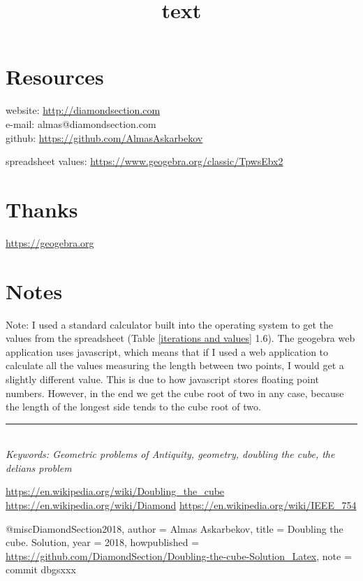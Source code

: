 \documentclass[12pt, letterpaper, oneside]{report}
\begin{document}
\begin{minipage}{0.8\textwidth}

\title{text}

	
\section{Resources}


website: \url{ http://diamondsection.com} \\
e-mail: almas@diamondsection.com \\
github: \url{https://github.com/AlmasAskarbekov}

spreadsheet values: \url{https://www.geogebra.org/classic/TpwsEbx2}

\section{Thanks}
\url{https://geogebra.org}
\\
\section{Notes}
Note: I used a standard calculator built into the operating system to get the values from the spreadsheet (Table \ref{iterations and values} 1.6). The geogebra web application uses javascript, which means that if I used a web application to calculate all the values measuring the length between two points, I would get a slightly different value. This is due to how javascript stores floating point numbers\cite{C}.  However, in the end we get the cube root of two in any case, because the length of the longest side tends to the cube root of two.
\end{minipage}
\vspace{365pt}
\hrule
\ 
\\
\emph{Keywords: Geometric problems of Antiquity, geometry, doubling the cube, the delians problem}




\begin{thebibliography}{5}
\url{https://en.wikipedia.org/wiki/Doubling_the_cube}
\url{https://en.wikipedia.org/wiki/Diamond}
\url{https://en.wikipedia.org/wiki/IEEE_754}
\end{thebibliography}

\vspace{465pt}
@misc{DiamondSection2018,
	author = {Almas Askarbekov},
	title = {Doubling the cube. Solution},
	year = {2018},
	howpublished = {\url{https://github.com/DiamondSection/Doubling-the-cube-Solution_Latex}},
	note = {commit dbgsxxx}
}
\end{document}
